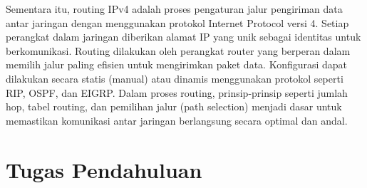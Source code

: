 Sementara itu, routing IPv4 adalah proses pengaturan jalur pengiriman data antar jaringan dengan menggunakan protokol Internet Protocol versi 4. Setiap perangkat dalam jaringan diberikan alamat IP yang unik sebagai identitas untuk berkomunikasi. Routing dilakukan oleh perangkat router yang berperan dalam memilih jalur paling efisien untuk mengirimkan paket data. Konfigurasi dapat dilakukan secara statis (manual) atau dinamis menggunakan protokol seperti RIP, OSPF, dan EIGRP. Dalam proses routing, prinsip-prinsip seperti jumlah hop, tabel routing, dan pemilihan jalur (path selection) menjadi dasar untuk memastikan komunikasi antar jaringan berlangsung secara optimal dan andal.

\section{Tugas Pendahuluan}
